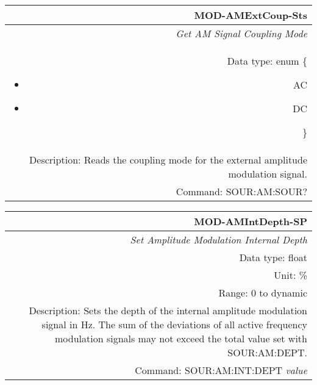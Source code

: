\documentclass[openany]{article}
\begin{document}
		\begin{tabular}{N}
			\hline
			\bfseries MOD-AMExtCoup-Sts \\ \hline
			\emph{Get AM Signal Coupling Mode} \\
			Data type: enum \{\begin{itemize}[noitemsep]
				\small
				\item[] AC
				\item[] DC
			\end{itemize}\} \\ 
			Description: Reads the coupling mode for the external amplitude modulation signal. \\
			Command: SOUR:AM:SOUR? \\

		\end{tabular}
%
		\begin{tabular}{N}
			\hline
			\bfseries MOD-AMIntDepth-SP \\ \hline
			\emph{Set Amplitude Modulation Internal Depth} \\
			Data type: float \\
			Unit: \% \\
			Range: 0 to dynamic \\
			Description: Sets the depth of the internal amplitude modulation signal in Hz. The sum of the deviations of all active frequency modulation signals may not exceed the total value set with SOUR:AM:DEPT. \\
			Command: SOUR:AM:INT:DEPT \emph{value} \\
			
		\end{tabular}
\end{document}
